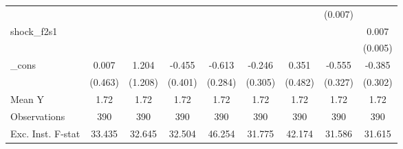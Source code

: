 {\begin{tabular}{l*{8}{c}}
            &                     &                     &                     &                     &                     &                     &     (0.007)         &                     \\
\addlinespace
shock\_f2s1  &                     &                     &                     &                     &                     &                     &                     &       0.007         \\
            &                     &                     &                     &                     &                     &                     &                     &     (0.005)         \\
\addlinespace
\_cons      &       0.007         &       1.204         &      -0.455         &      -0.613\sym{**} &      -0.246         &       0.351         &      -0.555         &      -0.385         \\
            &     (0.463)         &     (1.208)         &     (0.401)         &     (0.284)         &     (0.305)         &     (0.482)         &     (0.327)         &     (0.302)         \\
\midrule
Mean Y      &        1.72         &        1.72         &        1.72         &        1.72         &        1.72         &        1.72         &        1.72         &        1.72         \\
Observations&         390         &         390         &         390         &         390         &         390         &         390         &         390         &         390         \\
Exc. Inst. F-stat&      33.435         &      32.645         &      32.504         &      46.254         &      31.775         &      42.174         &      31.586         &      31.615         \\
\bottomrule
\end{tabular}
}
